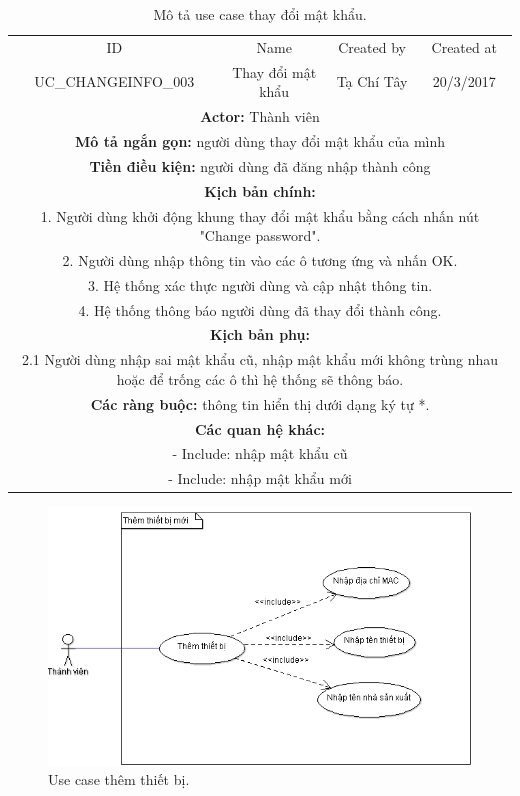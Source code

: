 \documentclass[a4paper,12pt,oneside]{article}
\begin{document}
\begin{table}[!htp]
\centering
\begin{tabularx}{\linewidth}{ |c||c|c|c| }
\hline
ID & Name & Created by & Created at\\
UC\_CHANGEINFO\_003 & Thay đổi mật khẩu & Tạ Chí Tây & 20/3/2017\\
\hline
\multicolumn{4}{|X|}{\textbf{Actor:} Thành viên }\\
\hline
\multicolumn{4}{|X|}{\textbf{Mô tả ngắn gọn:} người dùng thay đổi mật khẩu của mình}\\
\hline
\multicolumn{4}{|X|}{\textbf{Tiền điều kiện:} người dùng đã đăng nhập thành công}\\
\hline
\multicolumn{4}{|X|}{\textbf{Kịch bản chính:}}\\
\multicolumn{4}{|X|}{1. Người dùng khởi động khung thay đổi mật khẩu bằng cách nhấn nút "Change password".}\\
\multicolumn{4}{|X|}{
2.	Người dùng nhập thông tin vào các ô tương ứng và nhấn OK.}\\
\multicolumn{4}{|X|}{
3.	Hệ thống xác thực người dùng và cập nhật thông tin.}\\
\multicolumn{4}{|X|}{
4.	Hệ thống thông báo người dùng đã thay đổi thành công.}\\
\hline
\multicolumn{4}{|X|}{\textbf{Kịch bản phụ:}}\\
\multicolumn{4}{|X|}{2.1    Người dùng nhập sai mật khẩu cũ, nhập mật khẩu mới không trùng nhau hoặc để trống các ô thì hệ thống sẽ thông báo.}\\
\hline
\multicolumn{4}{|X|}{\textbf{Các ràng buộc:} thông tin hiển thị dưới dạng ký tự *.}\\
\hline
\multicolumn{4}{|X|}{\textbf{Các quan hệ khác:}}\\
\multicolumn{4}{|X|}{- Include: nhập mật khẩu cũ}\\
\multicolumn{4}{|X|}{- Include: nhập mật khẩu mới}\\
\hline
\end{tabularx}
\caption{Mô tả use case thay đổi mật khẩu.}
\end{table}

\begin{figure}[htp]
\centering
\includegraphics[scale=.9]{hinh/adddevice.png}
\caption{Use case thêm thiết bị.}
\end{figure}
\end{document}
